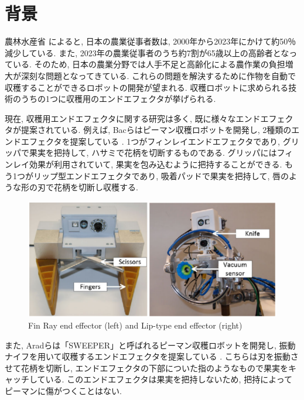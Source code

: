 
\section{背景}
農林水産省 \cite{farmer} によると, 日本の農業従事者数は, 2000年から2023年にかけて約50％減少している.
また, 2023年の農業従事者のうち約7割が65歳以上の高齢者となっている.
そのため, 日本の農業分野では人手不足と高齢化による農作業の負担増大が深刻な問題となってきている.
これらの問題を解決するために作物を自動で収穫することができるロボットの開発が望まれる.
収穫ロボットに求められる技術のうちの1つに収穫用のエンドエフェクタが挙げられる.

\vspace{5mm}

現在, 収穫用エンドエフェクタに関する研究は多く, 既に様々なエンドエフェクタが提案されている.
例えば, Bacらはピーマン収穫ロボットを開発し, 2種類のエンドエフェクタを提案している \cite{finray}.
1つがフィンレイエンドエフェクタであり, グリッパで果実を把持して, ハサミで花柄を切断するものである.
グリッパにはフィンレイ効果が利用されていて, 果実を包み込むように把持することができる.
もう1つがリップ型エンドエフェクタであり, 吸着パッドで果実を把持して, 唇のような形の刃で花柄を切断し収穫する.

\begin{figure}[H]
     \centering
     \includegraphics[width=130mm]{images/png/finray.png}
     \caption{Fin Ray end effector (left) and Lip-type end effector (right)}
     \label{Fig:finray}
   \end{figure}

また, Aradらは「SWEEPER」と呼ばれるピーマン収穫ロボットを開発し, 振動ナイフを用いて収穫するエンドエフェクタを提案している \cite{sweeper}.
こちらは刃を振動させて花柄を切断し, エンドエフェクタの下部についた指のようなもので果実をキャッチしている.
このエンドエフェクタは果実を把持しないため, 把持によってピーマンに傷がつくことはない.

